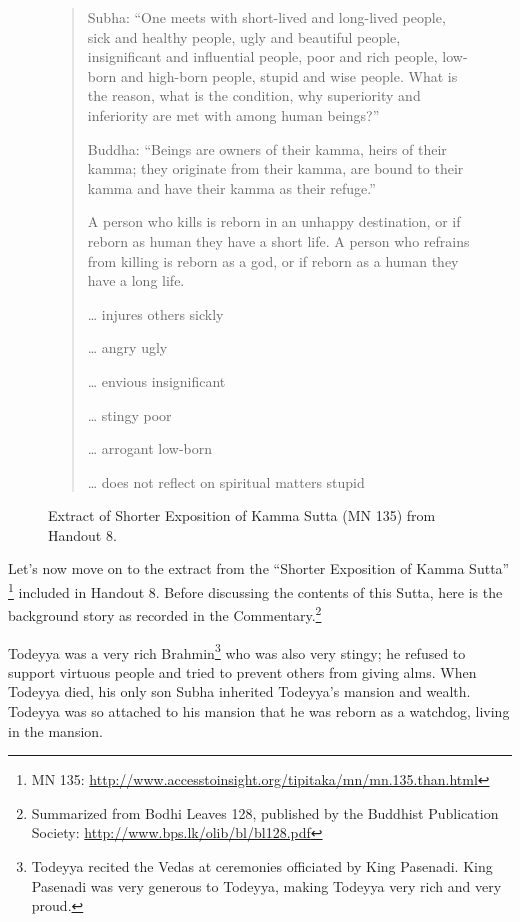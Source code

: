 \begin{figure}[H]
\begin{quotation}
Subha: “One meets with short-lived and long-lived people, sick and healthy people, ugly and beautiful people, insignificant and influential people, poor and rich people, low-born and high-born people, stupid and wise people. What is the reason, what is the condition, why superiority and inferiority are met with among human beings?”

Buddha: “Beings are owners of their kamma, heirs of their kamma; they originate from their kamma, are bound to their kamma and have their kamma as their refuge.”

A person who kills is reborn in an unhappy destination, or if reborn as human they have a short life. A person who refrains from killing is reborn as a god, or if reborn as a human they have a long life.

… injures others \textrightarrow \hspace{1mm} sickly

… angry \textrightarrow \hspace{1mm} ugly

… envious \textrightarrow \hspace{1mm} insignificant

… stingy \textrightarrow \hspace{1mm} poor

… arrogant \textrightarrow \hspace{1mm} low-born

… does not reflect on spiritual matters \textrightarrow \hspace{1mm} stupid
\end{quotation}
\caption{Extract of Shorter Exposition of Kamma Sutta (MN 135) from Handout 8.}
\label{fig:MN135}
\end{figure}

Let’s now move on to the extract from the “Shorter Exposition of Kamma Sutta” \footnote{MN 135: \url{http://www.accesstoinsight.org/tipitaka/mn/mn.135.than.html}} included in Handout 8. Before discussing the contents of this Sutta, here is the background story as recorded in the Commentary.\footnote{Summarized from Bodhi Leaves 128, published by the Buddhist Publication Society: \url{http://www.bps.lk/olib/bl/bl128.pdf}}

Todeyya was a very rich Brahmin\footnote{Todeyya recited the Vedas at ceremonies officiated by King Pasenadi. King Pasenadi was very generous to Todeyya, making Todeyya very rich and very proud.} who was also very stingy; he refused to support virtuous people and tried to prevent others from giving alms. When Todeyya died, his only son Subha inherited Todeyya’s mansion and wealth. Todeyya was so attached to his mansion that he was reborn as a watchdog, living in the mansion.

